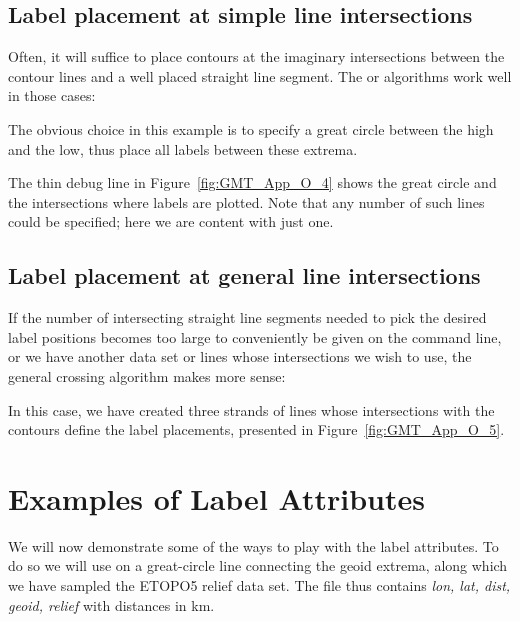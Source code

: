 \subsection{Label placement at simple line intersections}

Often, it will suffice to place contours at the imaginary intersections between the
contour lines and a well placed straight line segment.  The  or 
algorithms work well in those cases:



\noindent
The obvious choice in this example is to specify a great circle between the high and
the low, thus place all labels between these extrema.

\noindent
The thin debug line in Figure~\ref{fig:GMT_App_O_4} shows the great circle and the
intersections where labels are plotted.  Note that any number of such lines could be specified;
here we are content with just one.

\subsection{Label placement at general line intersections}

If the number of intersecting straight line segments needed to pick the desired label
positions becomes too large to conveniently be given on the command line, or we have
another data set or lines whose intersections we wish to use, the general crossing
algorithm makes more sense:




\noindent
In this case, we have created three strands of lines whose intersections with the contours
define the label placements, presented in Figure~\ref{fig:GMT_App_O_5}.

\section{Examples of Label Attributes}

We will now demonstrate some of the ways to play with the label attributes.  To do so we
will use  on a great-circle line connecting the geoid extrema, along which
we have sampled the ETOPO5 relief data set.  The file  thus contains
{\it lon, lat, dist, geoid, relief} with distances in km.

